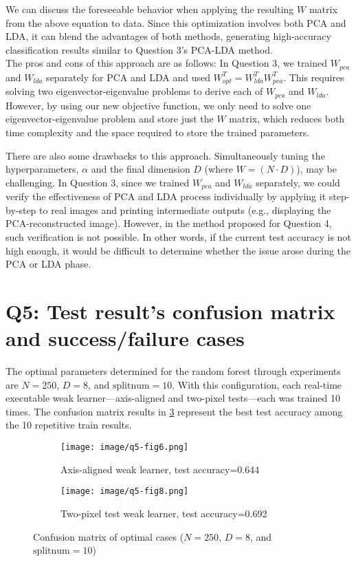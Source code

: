 We can discuss the foreseeable behavior when applying the resulting $W$ matrix from the above equation to data. Since this optimization involves both PCA and LDA, it can blend the advantages of both methods, generating high-accuracy classification results similar to Question 3's PCA-LDA method.\\

The pros and cons of this approach are as follows: In Question 3, we trained $W_{pca}$ and $W_{lda}$ separately for PCA and LDA and used $W_{opt}^T = W_{lda}^T W_{pca}^T$. This requires solving two eigenvector-eigenvalue problems to derive each of $W_{pca}$ and $W_{lda}$. However, by using our new objective function, we only need to solve one eigenvector-eigenvalue problem and store just the $W$ matrix, which reduces both time complexity and the space required to store the trained parameters.

There are also some drawbacks to this approach. Simultaneously tuning the hyperparameters, $\alpha$ and the final dimension $D$ (where $W = (N \cdot D)$), may be challenging. In Question 3, since we trained $W_{pca}$ and $W_{lda}$ separately, we could verify the effectiveness of PCA and LDA process individually by applying it step-by-step to real images and printing intermediate outputs (e.g., displaying the PCA-reconstructed image). However, in the method proposed for Question 4, such verification is not possible. In other words, if the current test accuracy is not high enough, it would be difficult to determine whether the issue arose during the PCA or LDA phase.


\section{Q5: Test result's confusion matrix and success/failure cases }
\label{subsec:Q5-1}
The optimal parameters determined for the random forest through experiments are $N=250$, $D=8$, and $\text{splitnum}=10$. With this configuration, each real-time executable weak learner—axis-aligned and two-pixel tests—each was trained 10 times. The confusion matrix results in \cref{fig:app-q5-6} represent the best test accuracy among the 10 repetitive train results.

\begin{figure}[htbp]
	\centering
	\begin{subfigure}[t]{0.4\linewidth}
		\centering
		\texttt{[image: image/q5-fig6.png]}
		\caption{Axis-aligned weak learner, test accuracy=0.644}
		\label{fig:q5-fig6}
	\end{subfigure}%
	\quad
	\begin{subfigure}[t]{0.4\linewidth}
		\centering
		\texttt{[image: image/q5-fig8.png]}
		\caption{Two-pixel test weak learner, test accuracy=0.692}
		\label{fig:q5-fig8}
	\end{subfigure}
	\caption{Confusion matrix of optimal cases ($N=250$, $D=8$, and $\text{splitnum}=10$)}
	\label{fig:app-q5-6}
\end{figure}

